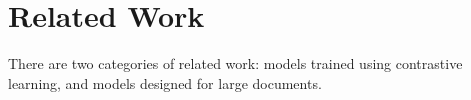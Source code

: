 \documentclass[11pt]{article}
\begin{document}
%

\section{Related Work}
\label{sec:related}

There are two categories of related work:
models trained using contrastive learning,
and models designed for large documents.
\end{document}
